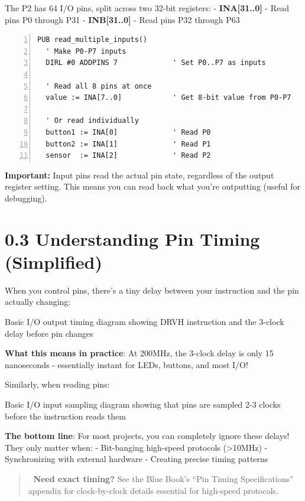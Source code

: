 \documentclass[11pt,a4paper,oneside,english]{book}
\begin{document}
The P2 has 64 I/O pins, split across two 32-bit registers: -
\textbf{INA{[}31..0{]}} - Read pins P0 through P31 -
\textbf{INB{[}31..0{]}} - Read pins P32 through P63

\begin{Spin2Block}
\begin{Verbatim}[numbers=left,numbersep=5pt,xleftmargin=15pt]
PUB read_multiple_inputs()
  ' Make P0-P7 inputs
  DIRL #0 ADDPINS 7             ' Set P0..P7 as inputs
  
  ' Read all 8 pins at once
  value := INA[7..0]            ' Get 8-bit value from P0-P7
  
  ' Or read individually
  button1 := INA[0]             ' Read P0
  button2 := INA[1]             ' Read P1
  sensor  := INA[2]             ' Read P2
\end{Verbatim}
\end{Spin2Block}

\textbf{Important:} Input pins read the actual pin state, regardless of
the output register setting. This means you can read back what you're
outputting (useful for debugging).

\hypertarget{understanding-pin-timing-simplified}{%
\section{0.3 Understanding Pin Timing
(Simplified)}\label{understanding-pin-timing-simplified}}

When you control pins, there's a tiny delay between your instruction and
the pin actually changing:

Basic I/O output timing diagram showing DRVH instruction and the 3-clock
delay before pin changes

\textbf{What this means in practice}: At 200MHz, the 3-clock delay is
only 15 nanoseconds - essentially instant for LEDs, buttons, and most
I/O!

Similarly, when reading pins:

Basic I/O input sampling diagram showing that pins are sampled 2-3
clocks before the instruction reads them

\textbf{The bottom line}: For most projects, you can completely ignore
these delays! They only matter when: - Bit-banging high-speed protocols
(\textgreater10MHz) - Synchronizing with external hardware - Creating
precise timing patterns

\begin{quote}
📘 \textbf{Need exact timing?} See the Blue Book's ``Pin Timing
Specifications'' appendix for clock-by-clock details essential for
high-speed protocols.
\end{quote}
\end{document}
